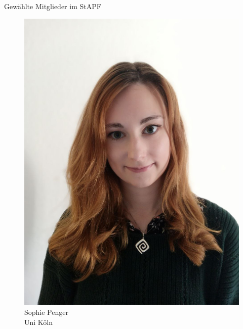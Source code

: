\documentclass[compress, aspectratio=169]{beamer}
\begin{document}
\begin{frame}{Gewählte Mitglieder im StAPF}
  \vspace{1cm}
  \hspace{0.1\textwidth}
   \begin{minipage}{.28\textwidth}
    \begin{figure}
      \begin{minipage}[c]{.57\textwidth}
        \includegraphics[height=0.35\textheight]{sophie.jpeg}
      \end{minipage} \hfill
      \begin{minipage}[c]{.4\textwidth}
        \caption*{Sophie Penger \\Uni Köln}
      \end{minipage}
    \end{figure}
  \end{minipage}
  \hspace{0.1\textwidth}
  \begin{minipage}{.28\textwidth}
    \begin{figure}
      \begin{minipage}[c]{.47\textwidth}

\end{minipage}
\end{figure}
\end{minipage}
\end{frame}
\end{document}
